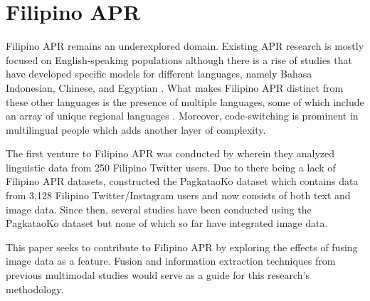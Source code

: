 \begin{comment}
\begin{itemize}
    \item \citet{tighe_modeling_2018}
    \item \citet{mairesse_using_2007}
    \item \citet{ilmini_persons_2016}
    \item \citet{deilami_using_2022}
    \item \citet{farnadi_computational_2016}
    \item \citet{celli_automatic_2014}
    \item \citet{sarkar_feature_2014}
    \item \citet{salem_personality_2019}
    \item \citet{farnadi_computational_2016}
\end{itemize}
\end{comment}

\section{Filipino APR}
\label{sec: FilipinoAPR}
Filipino APR remains an underexplored domain. Existing APR research is mostly focused on English-speaking populations although there is a rise of studies that have developed specific models for different languages, namely Bahasa Indonesian, Chinese, and Egyptian \citep{Siddique2019, Salem2019, Adi2018}. What makes Filipino APR distinct from these other languages is the presence of multiple languages, some of which include an array of unique regional languages \citep{Tighe_Acorda_Agno_Gano_Go_Santiago_Sedillo_2022,tighe_modeling_2018}. Moreover, code-switching is prominent in multilingual people which adds another layer of complexity.

The first venture to Filipino APR was conducted by \citet{tighe_modeling_2018} wherein they analyzed linguistic data from 250 Filipino Twitter users. Due to there being a lack of Filipino APR datasets, \citet{Tighe_Acorda_Agno_Gano_Go_Santiago_Sedillo_2022} constructed the PagkataoKo dataset which contains data from 3,128 Filipino Twitter/Instagram users and now consists of both text and image data. Since then, several studies have been conducted using the PagkataoKo dataset but none of which so far have integrated image data.

This paper seeks to contribute to Filipino APR by exploring the effects of fusing image data as a feature. Fusion and information extraction techniques from previous multimodal studies would serve as a guide for this research’s methodology.


